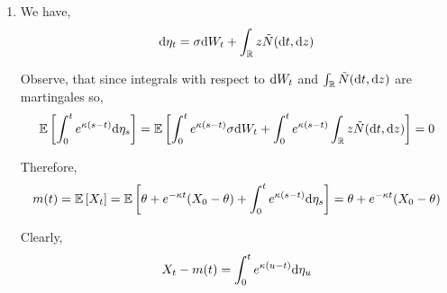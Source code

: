 \documentclass[10pt]{article}
\begin{document}
\begin{solution}[Solution]
\begin{enumerate}[label=(\alph*)]
        
    \item
        We have,
        \begin{align*}
            \mathrm{d} \eta_t = \sigma \mathrm{d} W_t + \int_{\mathbb{R}} z \tilde{N}(\mathrm{d} t, \mathrm{d} z)
        \end{align*}
       
        Observe, that since integrals with respect to \( \mathrm{d} W_t \) and \( \int_{\mathbb{R}} \tilde{N}(\mathrm{d} t, \mathrm{d} z) \) are martingales so,
        \begin{align*}
            \mathbb{E} \left[ \int_{0}^{t} e^{\kappa(s-t)} \mathrm{d} \eta_s \right]
            = \mathbb{E} \left[ \int_{0}^{t} e^{\kappa(s-t)} \sigma \mathrm{d} W_t + \int_{0}^{t} e^{\kappa(s-t)} \int_{\mathbb{R}} z \tilde{N}(\mathrm{d} t, \mathrm{d} z) \right] = 0
        \end{align*}
        
        Therefore,
        \begin{align*}
            m(t) = \mathbb{E} \left[ X_t \right]
            = \mathbb{E} \left[ \theta + e^{-\kappa t}(X_0 - \theta) + \int_{0}^{t} e^{\kappa(s-t)} \mathrm{d} \eta_s \right]
            = \theta + e^{-\kappa t}(X_0 - \theta)
        \end{align*}
        

        Clearly,
        \begin{align*}
            X_t - m(t) = \int_{0}^{t}e^{\kappa(u-t)} \mathrm{d} \eta_u
        \end{align*}

        \iffalse
        Observe,
        \begin{align*}
            \EE[\d\eta_u \d\eta_v]
            &= \EE \left[ \sigma^2 \d W_u \d W_v + \d W_u \int_{\RR} z \tilde{N}(\d v, \d z) + \d W_v \int_{\RR} y \tilde{N} (\d u, \d y) + \iint_{\RR^2} y z \tilde{N}(\d u, \d u) \tilde{N} (\d v, \d z)  \right]
            \\&= \EE \left[ \sigma^2 \d W_u \d W_v \right] + \EE\left[\int_{\RR} z \d W_u \tilde{N}(\d v, \d z) \right] 
            \\& \hspace{5em} + \EE\left [ \int_{\RR} y \d W_v \tilde{N} (\d u, \d y)\right] + \EE \left[\iint_{\RR^2} y z \tilde{N}(\d u, \d y) \tilde{N} (\d v, \d z)  \right]
            \\&= \sigma^2 \delta_{u,v} \d u + 0 + 0 + \iint_{\RR^2}\delta_{u,v} \delta(z-y) N(\d u, \d z)\d y
        \end{align*}
        \fi


\end{enumerate}
\end{solution}
\end{document}
